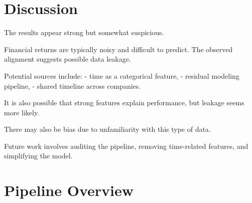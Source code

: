 \documentclass[11pt]{article}
\begin{document}
\section{Discussion}

The results appear strong but somewhat suspicious.

Financial returns are typically noisy and difficult to predict. The observed alignment suggests possible data leakage.

Potential sources include:
- time as a categorical feature,
- residual modeling pipeline,
- shared timeline across companies.

It is also possible that strong features explain performance, but leakage seems more likely.

There may also be bias due to unfamiliarity with this type of data.

Future work involves auditing the pipeline, removing time-related features, and simplifying the model.

\section{Pipeline Overview}

\begin{center}
\end{center}
\end{document}
